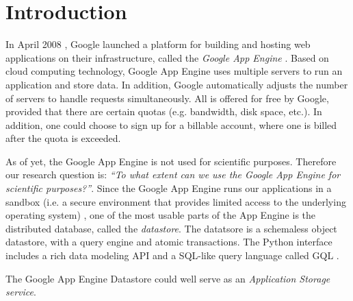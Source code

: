 \section{Introduction}
\label{introduction}
In April 2008 \cite{app-engine-intro}, Google launched a platform for building
and hosting web applications on their infrastructure, called the \emph{Google App
Engine} \cite{app-engine-www}. Based on cloud computing technology, Google App
Engine uses multiple servers to run an application and store data. In addition,
Google automatically adjusts the number of servers to handle requests
simultaneously. All is offered for free by Google, provided that there are
certain quotas (e.g. bandwidth, disk space, etc.). In addition, one could
choose to sign up for a billable account, where one is billed after the quota
is exceeded.

As of yet, the Google App Engine is not used for scientific purposes. Therefore
our research question is: \emph{``To what extent can we use the Google App Engine
for scientific purposes?''}. Since the Google App Engine runs our applications in
a sandbox (i.e. a secure environment that provides limited access to the
underlying operating system) \cite{app-engine-sandbox}, one of the most usable
parts of the App Engine is the distributed database, called the \emph{datastore}.
The datatsore is a schemaless object datastore, with a query engine and atomic
transactions. The Python interface includes a rich data modeling API and a
SQL-like query language called GQL \cite{app-engine-datastore}.

The Google App Engine Datastore could well serve as an \emph{Application
Storage service}. 

